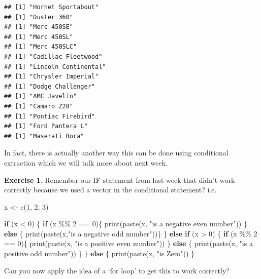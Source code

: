 \documentclass[
]{book}
\newenvironment{Shaded}{\begin{snugshade}}{\end{snugshade}}
\newcommand{\ControlFlowTok}[1]{\textcolor[rgb]{0.13,0.29,0.53}{\textbf{#1}}}
\newcommand{\DecValTok}[1]{\textcolor[rgb]{0.00,0.00,0.81}{#1}}
\newcommand{\FunctionTok}[1]{\textcolor[rgb]{0.00,0.00,0.00}{#1}}
\newcommand{\NormalTok}[1]{#1}
\newcommand{\OtherTok}[1]{\textcolor[rgb]{0.56,0.35,0.01}{#1}}
\newcommand{\SpecialCharTok}[1]{\textcolor[rgb]{0.00,0.00,0.00}{#1}}
\newcommand{\StringTok}[1]{\textcolor[rgb]{0.31,0.60,0.02}{#1}}
\theoremstyle{definition}
\theoremstyle{definition}
\theoremstyle{definition}
\newtheorem{exercise}{Exercise}[chapter]
\theoremstyle{definition}
\theoremstyle{remark}
\begin{document}
\begin{verbatim}
## [1] "Hornet Sportabout"
## [1] "Duster 360"
## [1] "Merc 450SE"
## [1] "Merc 450SL"
## [1] "Merc 450SLC"
## [1] "Cadillac Fleetwood"
## [1] "Lincoln Continental"
## [1] "Chrysler Imperial"
## [1] "Dodge Challenger"
## [1] "AMC Javelin"
## [1] "Camaro Z28"
## [1] "Pontiac Firebird"
## [1] "Ford Pantera L"
## [1] "Maserati Bora"
\end{verbatim}

In fact, there is actually another way this can be done using conditional extraction which we will talk more about next week.

\begin{exercise}
Remember our IF statement from last week that didn't work correctly because we used a vector in the conditional statement? i.e.

\begin{Shaded}
\begin{Highlighting}[]
\NormalTok{x }\OtherTok{\textless{}{-}} \FunctionTok{c}\NormalTok{(}\DecValTok{1}\NormalTok{, }\DecValTok{2}\NormalTok{, }\DecValTok{3}\NormalTok{)}

\ControlFlowTok{if}\NormalTok{ (x }\SpecialCharTok{\textless{}} \DecValTok{0}\NormalTok{) \{}
  \ControlFlowTok{if}\NormalTok{ (x }\SpecialCharTok{\%\%} \DecValTok{2} \SpecialCharTok{==} \DecValTok{0}\NormalTok{)\{}
    \FunctionTok{print}\NormalTok{(}\FunctionTok{paste}\NormalTok{(x, }\StringTok{"is a negative even number"}\NormalTok{))}
\NormalTok{  \} }\ControlFlowTok{else}\NormalTok{ \{ }
    \FunctionTok{print}\NormalTok{(}\FunctionTok{paste}\NormalTok{(x,}\StringTok{"is a negative odd number"}\NormalTok{))\}}
\NormalTok{\} }\ControlFlowTok{else} \ControlFlowTok{if}\NormalTok{ (x }\SpecialCharTok{\textgreater{}} \DecValTok{0}\NormalTok{) \{}
  \ControlFlowTok{if}\NormalTok{ (x }\SpecialCharTok{\%\%} \DecValTok{2} \SpecialCharTok{==} \DecValTok{0}\NormalTok{)\{}
    \FunctionTok{print}\NormalTok{(}\FunctionTok{paste}\NormalTok{(x, }\StringTok{"is a positive even number"}\NormalTok{))}
\NormalTok{  \} }\ControlFlowTok{else}\NormalTok{ \{}
    \FunctionTok{print}\NormalTok{(}\FunctionTok{paste}\NormalTok{(x, }\StringTok{"is a positive odd number"}\NormalTok{))}
\NormalTok{  \}}
\NormalTok{\} }\ControlFlowTok{else}\NormalTok{ \{}
  \FunctionTok{print}\NormalTok{(}\FunctionTok{paste}\NormalTok{(x, }\StringTok{"is Zero"}\NormalTok{))}
\NormalTok{\}}
\end{Highlighting}
\end{Shaded}

Can you now apply the idea of a `for loop' to get this to work correctly?
\end{exercise}
\end{document}
